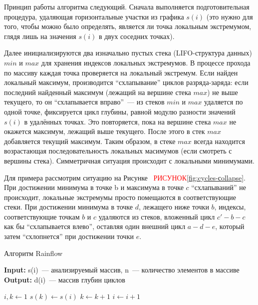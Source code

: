 \begin{enumerate}
Принцип работы алгоритма следующий. 
Сначала выполняется подготовительная процедура, удаляющая горизонтальные участки из графика $s(i)$ (это нужно для того, чтобы можно было определять, является ли точка локальным экстремумом, глядя лишь на значения $s(i)$ в двух соседних точках).

Далее инициализируются два изначально пустых стека (LIFO-структура данных) $min$ и $max$ для хранения индексов локальных экстремумов.
В процессе прохода по массиву каждая точка проверяется на локальный экстремум.
Если найден локальный максимум, производится ``схлапывание'' циклов разряда-заряда: если последний найденный максимум (лежащий на вершине стека $max$) не выше текущего, то он ``схлапывается вправо''~--- из стеков $min$ и $max$ удаляется по одной точке, фиксируется цикл глубины, равной модулю разности значений $s(i)$ в удалённых точках.
Это повторяется, пока на вершине стека $max$ не окажется максимум, лежащий выше текущего. 
После этого в стек $max$ добавляется текущий максимум.
Таким образом, в стеке $max$ всегда находится возрастающая последовательность локальных масимумов (если смотреть с вершины стека).
Симметричная ситуация происходит с локальными минимумами. 

Для примера рассмотрим ситуацию на Рисунке~ \textcolor{red}{РИСУНОК}\ref{fig:cycles-сollapse}.
При достижении минимума в точке b и максимума в точке $c$ ``схлапываний'' не происходит,
локальные экстремумы просто помещаются в  соответствующие стеки.
При достижении минимума в точке $d$, лежащего ниже точки $b$, 
индексы,  соответствующие точкам $b$ и $c$ удаляются из стеков,
вложенный цикл $c'-b-c$ как бы ``схлапывается влево'', 
оставляя один внешний цикл $a-d-e$, который затем ``схлопнется'' при достижении точки $e$. 

\begin{algorithm}
\caption{Алгоритм Rainflow}\label{alg:rainflow}
\hspace*{\algorithmicindent} \textbf{Input:} s(i)~--- анализируемый массив, n~--- количество элементов в массиве \\
\hspace*{\algorithmicindent} \textbf{Output:} d(i)~--- массив глубин циклов 
\begin{algorithmic}[1]

\State $i,k \gets 1$
 
    \State $s(k) \gets s(i)$ 
    \State $k \gets k + 1$
\EndIf
\State $i \gets i + 1$
\EndWhile
{}
\Statex


\end{algorithmic}
\end{algorithm}
\end{enumerate}
